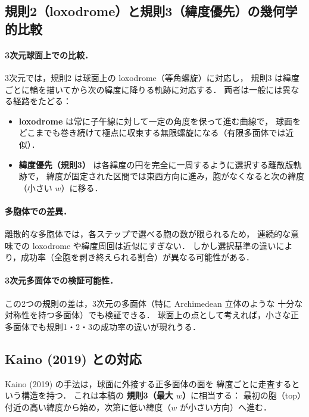 \documentclass[12pt,a4paper]{article}
\theoremstyle{definition}
\begin{document}
\subsection{規則2（loxodrome）と規則3（緯度優先）の幾何学的比較}

\paragraph{3次元球面上での比較．}
3次元では，規則2 は球面上の loxodrome（等角螺旋）に対応し，
規則3 は緯度ごとに輪を描いてから次の緯度に降りる軌跡に対応する．
両者は一般には異なる経路をたどる：
\begin{itemize}
  \item \textbf{loxodrome} は常に子午線に対して一定の角度を保って進む曲線で，
    球面をどこまでも巻き続けて極点に収束する無限螺旋になる（有限多面体では近似）．
  \item \textbf{緯度優先（規則3）} は各緯度の円を完全に一周するように選択する離散版軌跡で，
    緯度が固定された区間では東西方向に進み，胞がなくなると次の緯度（小さい $w$）に移る．
\end{itemize}

\paragraph{多胞体での差異．}
離散的な多胞体では，各ステップで選べる胞の数が限られるため，
連続的な意味での loxodrome や緯度周回は近似にすぎない．
しかし選択基準の違いにより，成功率（全胞を剥き終えられる割合）が異なる可能性がある．

\paragraph{3次元多面体での検証可能性．}
この2つの規則の差は，3次元の多面体（特に Archimedean 立体のような
十分な対称性を持つ多面体）でも検証できる．
球面上の点として考えれば，小さな正多面体でも規則1・2・3の成功率の違いが現れうる．

\subsection{Kaino (2019) との対応}

Kaino (2019) \cite{Kaino2019} の手法は，球面に外接する正多面体の面を
緯度ごとに走査するという構造を持つ．
これは本稿の \textbf{規則3（最大 $w$）}に相当する：
最初の胞（top）付近の高い緯度から始め，次第に低い緯度（$w$ が小さい方向）へ進む．
\end{document}
